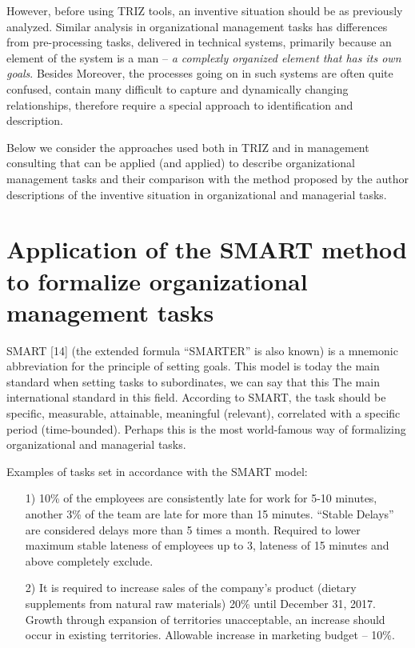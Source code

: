 However, before using TRIZ tools, an inventive situation should be as
previously analyzed. Similar analysis in organizational management tasks has
differences from pre-processing tasks, delivered in technical systems,
primarily because an element of the system is a man -- \emph{a complexly
  organized element that has its own goals}. Besides Moreover, the processes
going on in such systems are often quite confused, contain many difficult to
capture and dynamically changing relationships, therefore require a special
approach to identification and description.

Below we consider the approaches used both in TRIZ and in management
consulting that can be applied (and applied) to describe organizational
management tasks and their comparison with the method proposed by the author
descriptions of the inventive situation in organizational and managerial
tasks.

\section{Application of the SMART method to formalize organizational
  management tasks} 

SMART [14] (the extended formula “SMARTER” is also known) is a mnemonic
abbreviation for the principle of setting goals. This model is today the main
standard when setting tasks to subordinates, we can say that this The main
international standard in this field. According to SMART, the task should be
specific, measurable, attainable, meaningful (relevant), correlated with a
specific period (time-bounded). Perhaps this is the most world-famous way of
formalizing organizational and managerial tasks.

Examples of tasks set in accordance with the SMART model:
\begin{itemize}\it
\item[1)] 10\% of the employees are consistently late for work for 5-10
  minutes, another 3\% of the team are late for more than 15 minutes. “Stable
  Delays” are considered delays more than 5 times a month. Required to lower
  maximum stable lateness of employees up to 3, lateness of 15 minutes and
  above completely exclude.
\item[2)] It is required to increase sales of the company's product (dietary
  supplements from natural raw materials) 20\% until December 31, 2017. Growth
  through expansion of territories unacceptable, an increase should occur in
  existing territories.  Allowable increase in marketing budget -- 10\%.
\end{itemize}

